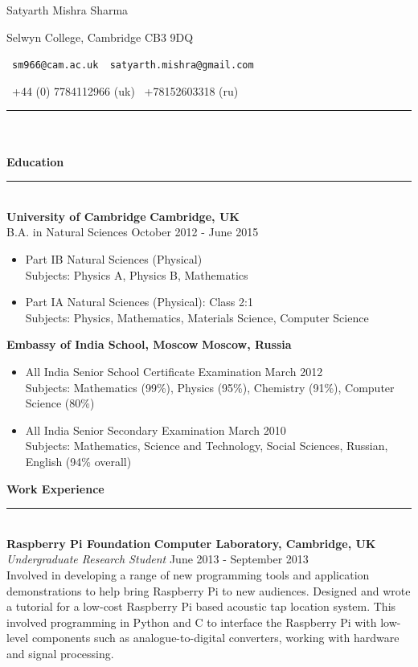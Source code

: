 \documentclass[11pt]{article}
\begin{document}

\centerline{{\huge \sc Satyarth Mishra Sharma}}  %
\centerline{Selwyn College, Cambridge CB3 9DQ}
\centerline{\Letter\ \texttt{sm966@cam.ac.uk \textpipe\ satyarth.mishra@gmail.com}}
\centerline{\Telefon\ +44 (0) 7784112966 (uk) \textpipe\ +78152603318 (ru)}
\noindent
\rule{480pt}{4pt}\\\\

\noindent\textbf{\LARGE\sc Education}\\
\rule{480pt}{0.8pt}\\

\noindent\textbf{\large University of Cambridge} \hfill \textbf{Cambridge, UK}\\
B.A. in Natural Sciences \hfill October 2012 - June 2015
\begin{itemize}
  \item Part IB Natural Sciences (Physical)\\
  		Subjects: Physics A, Physics B, Mathematics
  \item Part IA Natural Sciences (Physical): Class 2:1\\
  		Subjects: Physics, Mathematics, Materials Science, Computer Science
\end{itemize}

\noindent\textbf{\large Embassy of India School, Moscow} \hfill \textbf{Moscow, Russia}
\begin{itemize}
  \item All India Senior School Certificate Examination \hfill March 2012\\
Subjects: Mathematics (99\%), Physics (95\%), Chemistry (91\%), Computer Science (80\%)
  \item All India Senior Secondary Examination \hfill March 2010\\
Subjects: Mathematics, Science and Technology, Social Sciences, Russian, English (94\% overall) 
\end{itemize}

\noindent\textbf{\LARGE\sc Work Experience}\\
\rule{480pt}{0.8pt}\\

\noindent\textbf{\large Raspberry Pi Foundation} \hfill \textbf{Computer Laboratory, Cambridge, UK}\\
\emph{Undergraduate Research Student} \hfill June 2013 - September 2013\\
Involved in developing a range of new programming tools and application demonstrations to help bring Raspberry Pi to new audiences. Designed and wrote a tutorial for a low-cost Raspberry Pi based acoustic tap location system. This involved programming in Python and C to interface the Raspberry Pi with low-level components such as analogue-to-digital converters, working with hardware and signal processing.\\
\end{document}
